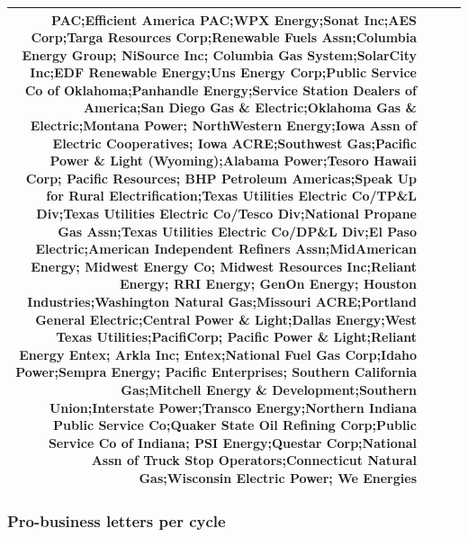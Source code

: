 \documentclass[]{article}
\begin{document}
\begin{longtable}[]{@{}rlrl@{}}
PAC;Efficient America PAC;WPX Energy;Sonat Inc;AES Corp;Targa Resources
Corp;Renewable Fuels Assn;Columbia Energy Group; NiSource Inc; Columbia
Gas System;SolarCity Inc;EDF Renewable Energy;Uns Energy Corp;Public
Service Co of Oklahoma;Panhandle Energy;Service Station Dealers of
America;San Diego Gas \& Electric;Oklahoma Gas \& Electric;Montana
Power; NorthWestern Energy;Iowa Assn of Electric Cooperatives; Iowa
ACRE;Southwest Gas;Pacific Power \& Light (Wyoming);Alabama Power;Tesoro
Hawaii Corp; Pacific Resources; BHP Petroleum Americas;Speak Up for
Rural Electrification;Texas Utilities Electric Co/TP\&L Div;Texas
Utilities Electric Co/Tesco Div;National Propane Gas Assn;Texas
Utilities Electric Co/DP\&L Div;El Paso Electric;American Independent
Refiners Assn;MidAmerican Energy; Midwest Energy Co; Midwest Resources
Inc;Reliant Energy; RRI Energy; GenOn Energy; Houston
Industries;Washington Natural Gas;Missouri ACRE;Portland General
Electric;Central Power \& Light;Dallas Energy;West Texas
Utilities;PacifiCorp; Pacific Power \& Light;Reliant Energy Entex; Arkla
Inc; Entex;National Fuel Gas Corp;Idaho Power;Sempra Energy; Pacific
Enterprises; Southern California Gas;Mitchell Energy \&
Development;Southern Union;Interstate Power;Transco Energy;Northern
Indiana Public Service Co;Quaker State Oil Refining Corp;Public Service
Co of Indiana; PSI Energy;Questar Corp;National Assn of Truck Stop
Operators;Connecticut Natural Gas;Wisconsin Electric Power; We
Energies\tabularnewline
\bottomrule
\end{longtable}

\subsubsection{Pro-business letters per
cycle}\label{pro-business-letters-per-cycle}
\end{document}
